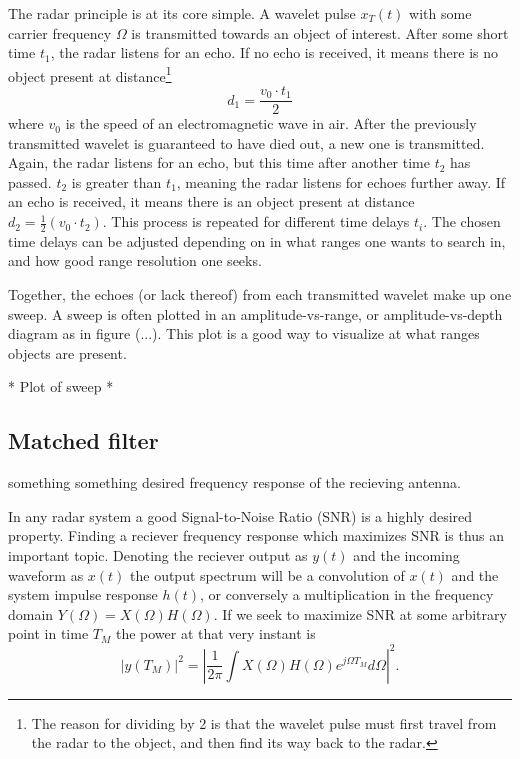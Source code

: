 \documentclass[a4paper, 12pt]{article}
\begin{document}
The radar principle is at its core simple.  A wavelet pulse $x_T(t)$ with some carrier frequency $\Omega$  is transmitted towards an object of interest. After some short time $t_1$, the radar listens for an echo. If no echo is received, it means there is no object present at distance\footnote{The reason for dividing by 2 is that the wavelet pulse must first travel from the radar to the object, and then find its way back to the radar.}
\begin{equation}
	d_1 = \frac{v_0\cdot t_1}2
\end{equation}
where $v_0$ is the speed of an electromagnetic wave in air. After the previously transmitted wavelet is guaranteed to have died out, a new one is transmitted. Again, the radar listens for an echo, but this time after another time $t_2$ has passed. $t_2$ is greater than $t_1$, meaning the radar listens for echoes further away. If an echo is received, it means there is an object present at distance 
$
	d_2 = \frac12(v_0\cdot t_2).
$
This process is repeated for different time delays $t_i$. The chosen time delays can be adjusted depending on in what ranges one wants to search in, and how good range resolution one seeks.

Together, the echoes (or lack thereof) from each transmitted wavelet make up one sweep. A sweep is often plotted in an amplitude-vs-range, or amplitude-vs-depth diagram as in figure (...). This plot is a good way to visualize at what ranges objects are present.

* Plot of sweep *

\subsection{Matched filter}

something something desired frequency response of the recieving antenna. 

In any radar system a good Signal-to-Noise Ratio (SNR) is a highly desired property. Finding a reciever frequency response which maximizes SNR is thus an important topic. Denoting the reciever output as $y(t)$ and the incoming waveform as $x(t)$ the output spectrum will be a convolution of $x(t)$ and the system impulse response $h(t)$, or conversely a multiplication in the frequency domain $Y(\Omega) = X(\Omega)H(\Omega)$. If we seek to maximize SNR at some arbitrary point in time $T_M$ the power at that very instant is
%
\begin{equation}
	|y(T_M)|^{2} = |\frac{1}{2\pi}\int X(\Omega)H(\Omega)e^{j\Omega T_M} d\Omega|^{2}.
\end{equation}
\end{document}
